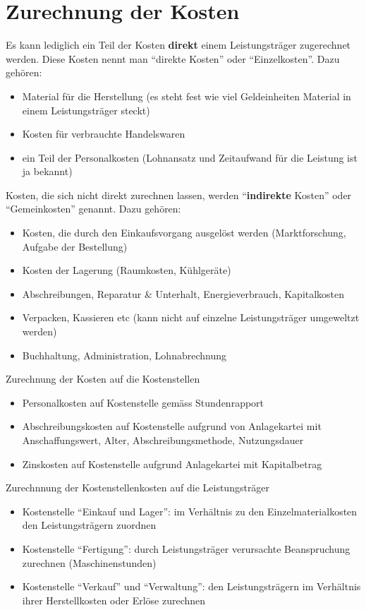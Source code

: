 \section*{Zurechnung der Kosten}

Es kann lediglich ein Teil der Kosten \textbf{direkt} einem Leistungsträger
zugerechnet werden. Diese Kosten nennt man ``direkte Kosten'' oder
``Einzelkosten''. Dazu gehören:
\begin{itemize}
\item Material für die Herstellung (es steht fest wie viel Geldeinheiten
Material in einem Leistungsträger steckt)
\item Kosten für verbrauchte Handelswaren
\item ein Teil der Personalkosten (Lohnansatz und Zeitaufwand für die Leistung
ist ja bekannt)
\end{itemize}
Kosten, die sich nicht direkt zurechnen lassen, werden ``\textbf{indirekte}
Kosten'' oder ``Gemeinkosten'' genannt. Dazu gehören:
\begin{itemize}
\item Kosten, die durch den Einkaufsvorgang ausgelöst werden (Marktforschung,
Aufgabe der Bestellung)
\item Kosten der Lagerung (Raumkosten, Kühlgeräte)
\item Abschreibungen, Reparatur \& Unterhalt, Energieverbrauch, Kapitalkosten
\item Verpacken, Kassieren etc (kann nicht auf einzelne Leistungsträger
umgeweltzt werden)
\item Buchhaltung, Administration, Lohnabrechnung
\end{itemize}
Zurechnung der Kosten auf die Kostenstellen
\begin{itemize}
\item Personalkosten auf Kostenstelle gemäss Stundenrapport
\item Abschreibungskosten auf Kostenstelle aufgrund von Anlagekartei mit
Anschaffungswert, Alter, Abschreibungsmethode, Nutzungsdauer
\item Zinskosten auf Kostenstelle aufgrund Anlagekartei mit Kapitalbetrag
\end{itemize}
Zurechnnung der Kostenstellenkosten auf die Leistungsträger
\begin{itemize}
\item Kostenstelle ``Einkauf und Lager'': im Verhältnis zu den Einzelmaterialkosten
den Leistungsträgern zuordnen
\item Kostenstelle ``Fertigung'': durch Leistungsträger verursachte Beanspruchung
zurechnen (Maschinenstunden)
\item Kostenstelle ``Verkauf'' und ``Verwaltung'': den Leistungsträgern
im Verhältnis ihrer Herstellkosten oder Erlöse zurechnen
\end{itemize}

